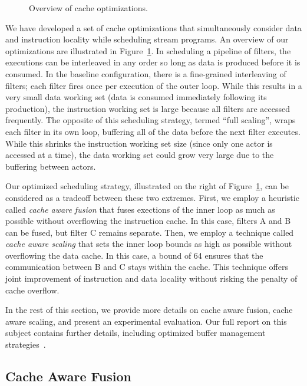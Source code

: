 \begin{figure}[t]
\caption{Overview of cache optimizations.\protect\label{fig:cacheopt}}
\end{figure}

We have developed a set of cache optimizations that simultaneously
consider data and instruction locality while scheduling stream
programs.  An overview of our optimizations are illustrated in
Figure~\ref{fig:cacheopt}.  In scheduling a pipeline of filters, the
executions can be interleaved in any order so long as data is produced
before it is consumed.  In the baseline configuration, there is a
fine-grained interleaving of filters; each filter fires once per
execution of the outer loop.  While this results in a very small data
working set (data is consumed immediately following its production),
the instruction working set is large because all filters are accessed
frequently.  The opposite of this scheduling strategy, termed ``full
scaling'', wraps each filter in its own loop, buffering all of the
data before the next filter executes.  While this shrinks the
instruction working set size (since only one actor is accessed at a
time), the data working set could grow very large due to the buffering
between actors.

Our optimized scheduling strategy, illustrated on the right of
Figure~\ref{fig:cacheopt}, can be considered as a tradeoff between
these two extremes.  First, we employ a heuristic called {\it cache
aware fusion} that fuses exections of the inner loop as much as
possible without overflowing the instruction cache.  In this case,
filters A and B can be fused, but filter C remains separate.  Then, we
employ a technique called {\it cache aware scaling} that sets the
inner loop bounds as high as possible without overflowing the data
cache.  In this case, a bound of 64 ensures that the communication
between B and C stays within the cache.  This technique offers joint
improvement of instruction and data locality without risking the
penalty of cache overflow.

In the rest of this section, we provide more details on cache aware
fusion, cache aware scaling, and present an experimental evaluation.
Our full report on this subject contains further details, including
optimized buffer management
strategies~\cite{sermulins:lctes:2005,sermulins-thesis}.

\subsection*{Cache Aware Fusion}

